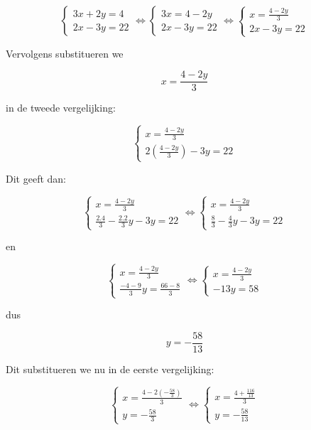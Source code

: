 \[\left\{ \begin{array}{l}
3x + 2y = 4 \\
2x - 3y = 22
\end{array} \right. \Leftrightarrow \left\{ \begin{array}{l}
3x = 4 - 2y\\
2x - 3y = 22
\end{array} \right. \Leftrightarrow \left\{ \begin{array}{l}
x = \frac{4 - 2y}{3}\\
2x - 3y = 22
\end{array} \right.\]

Vervolgens substitueren we

\[x = \frac{4 - 2y}{3} \]

in de tweede vergelijking:

\[ \left\{ \begin{array}{l}
x = \frac{4 - 2y}{3}\\
2 ( \frac{4 - 2y}{3} ) - 3y = 22
\end{array} \right.\]

Dit geeft dan:

\[\left\{ \begin{array}{l}
x = \frac{4 - 2y}{3} \\
\frac{2.4}{3} -\frac{2.2}{3}y -3y = 22
\end{array} \right. \Leftrightarrow \left\{ \begin{array}{l}
x = \frac{4 - 2y}{3}\\
\frac{8}{3}-\frac{4}{3}y -3y = 22
\end{array} \right.\]

en

\[\left\{ \begin{array}{l}
x = \frac{4 - 2y}{3} \\
\frac{-4-9}{3}y = \frac{66-8}{3}
\end{array} \right. \Leftrightarrow \left\{ \begin{array}{l}
x = \frac{4 - 2y}{3}\\
-13y=58
\end{array} \right.\]

dus

\[y=-\frac{58}{13} \]

Dit substitueren we nu in de eerste vergelijking:

\[\left\{ \begin{array}{l}
x = \frac{4 - 2(-\frac{58}{3})}{3} \\
y=-\frac{58}{3}
\end{array} \right. \Leftrightarrow \left\{ \begin{array}{l}
x = \frac{4+\frac{116}{13}}{3}\\
y=-\frac{58}{13}
\end{array} \right.\]

